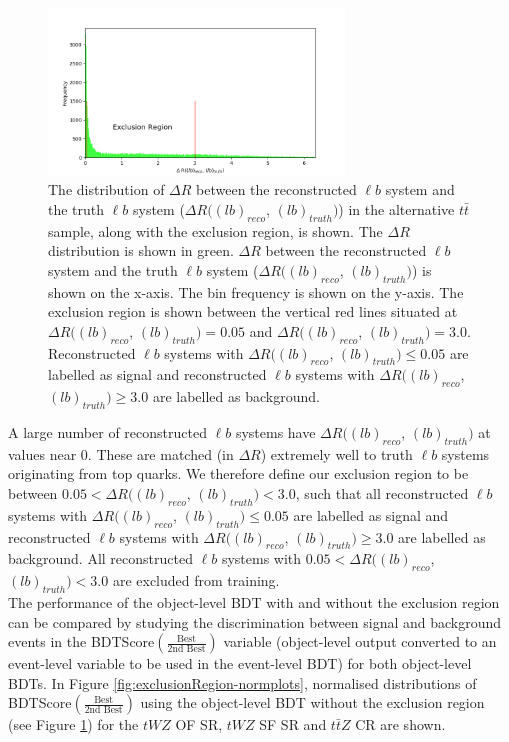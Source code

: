 \begin{figure}
    \centering
    \includegraphics[width=0.7\textwidth]{figures/DeltaR_lb_bdt.png}
    \caption{The distribution of $\Delta R$ between the reconstructed $\ell b$ system and the truth $\ell b$ system ($\Delta R((lb)_{reco}$, $(lb)_{truth})$) in the alternative $t\bar{t}$ sample, along with the exclusion region, is shown. The $\Delta R$ distribution is shown in green. $\Delta R$ between the reconstructed $\ell b$ system and the truth $\ell b$ system ($\Delta R((lb)_{reco}$, $(lb)_{truth})$) is shown on the x-axis. The bin frequency is shown on the y-axis. The exclusion region is shown between the vertical red lines situated at $\Delta R((lb)_{reco}$, $(lb)_{truth}) = 0.05$ and $\Delta R((lb)_{reco}$, $(lb)_{truth})=3.0$. Reconstructed $\ell b$ systems with $\Delta R((lb)_{reco}$, $(lb)_{truth}) \leq 0.05$ are labelled as signal and reconstructed $\ell b$ systems with $\Delta R((lb)_{reco}$, $(lb)_{truth}) \geq 3.0$ are labelled as background. }
    \label{fig:exclusionRegion}
\end{figure}

A large number of reconstructed $\ell b$ systems have $\Delta R((lb)_{reco}$, $(lb)_{truth})$ at values near $0$. These are matched (in $\Delta R$) extremely well to truth $\ell b$ systems originating from top quarks. We therefore define our exclusion region to be between $0.05 < \Delta R((lb)_{reco}$, $(lb)_{truth}) < 3.0$, such that all reconstructed $\ell b$ systems with $\Delta R((lb)_{reco}$, $(lb)_{truth}) \leq 0.05$ are labelled as signal and reconstructed $\ell b$ systems with $\Delta R((lb)_{reco}$, $(lb)_{truth}) \geq 3.0$ are labelled as background. All reconstructed $\ell b$ systems with $0.05 < \Delta R((lb)_{reco}$, $(lb)_{truth}) < 3.0$ are excluded from training.\\

The performance of the object-level BDT with and without the exclusion region can be compared by studying the discrimination between signal and background events in the BDTScore$(\frac{\text{Best}}{\text{2nd Best}})$ variable (object-level output converted to an event-level variable to be used in the event-level BDT) for both object-level BDTs. In Figure \ref{fig:exclusionRegion-normplots}, normalised distributions of BDTScore$(\frac{\text{Best}}{\text{2nd Best}})$ using the object-level BDT without the exclusion region (see Figure \ref{fig:exclusionRegion}) for the $tWZ$ OF SR, $tWZ$ SF SR and $t\bar{t}Z$ CR are shown.


